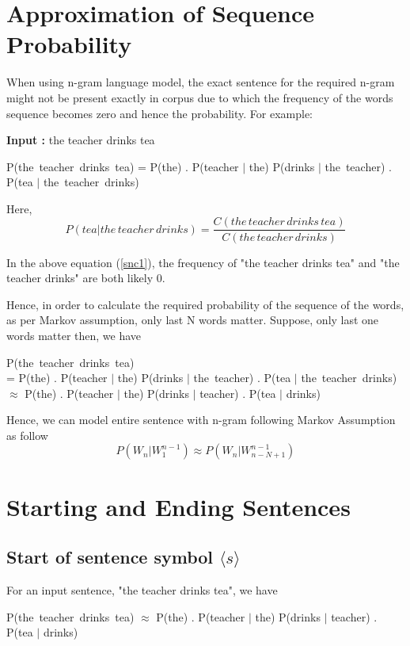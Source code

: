 \section{Approximation of Sequence Probability}
When using n-gram language model, the exact sentence for the required n-gram might not be present exactly in corpus due to which the frequency of the words sequence becomes zero and hence the probability. For example:

\textbf{Input :} the teacher drinks tea

P(the\, teacher\, drinks\, tea) = P(the) . P(teacher \(|\)  the)
P(drinks \(|\) the\, teacher) . P(tea \(|\) the\, teacher\, drinks)

Here,
\begin{equation}\label{snc1}
	P(tea | the\, teacher\, drinks) = \frac{C(the\, teacher\, drinks \, tea)}{C(the\, teacher\, drinks)}
\end{equation}

In the above equation (\ref{snc1}), the frequency of "the teacher drinks tea" and "the teacher drinks" are both likely 0.

Hence, in order to calculate the required probability of the sequence of the words, as
per Markov assumption, only last N words matter. Suppose, only last one words
matter then, we have

P(the\, teacher\, drinks\, tea) \\
= P(the) . P(teacher \(|\) the) P(drinks \(|\) the\, teacher) . P(tea \(|\) the\, teacher\, drinks) \\
$\approx$ P(the) . P(teacher \(|\) the) P(drinks \(|\) teacher) . P(tea \(|\) drinks)

Hence, we can model entire sentence with n-gram following Markov Assumption as follow
\begin{equation}
	P(W_n | W_1^{n - 1}) \approx P(W_n | W_{n - N + 1}^{n - 1})
\end{equation}

\section{Starting and Ending Sentences}
\subsection{Start of sentence symbol $\langle s \rangle$}
For an input sentence, "the teacher drinks tea", we have

P(the\, teacher\, drinks\, tea) $\approx$ P(the) . P(teacher \(|\) the) P(drinks \(|\) teacher) . P(tea \(|\) drinks)

